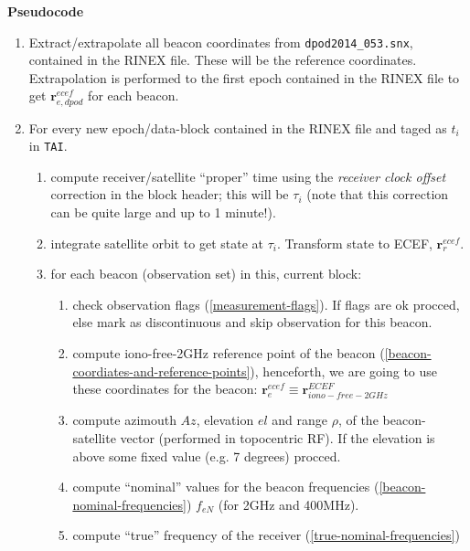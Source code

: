 \textbf{Pseudocode}
\begin{enumerate}
  
  \item Extract/extrapolate all beacon coordinates from \texttt{dpod2014\_053.snx}, 
    contained in the RINEX file. These will be the reference coordinates. 
    Extrapolation is performed to the first epoch contained in the RINEX file to 
    get $\bm{r}_{e,dpod}^{ecef}$ for each beacon.

  \item For every new epoch/data-block contained in the RINEX file and taged as $t_i$ in \texttt{TAI}.
  \begin{enumerate}
    \item compute receiver/satellite ``proper'' time using the 
    \emph{receiver clock offset} correction in the block header; this will 
     be $\tau_{i}$ (note that this correction can be quite large and up to 
     1 minute!).

    \item integrate satellite orbit to get state at {\color{red} $\tau_{i}$}. 
    Transform state to ECEF, $\bm{r}_{r}^{ecef}$.

    \item for each beacon (observation set) in this, current block:
    \begin{enumerate}
      \item check observation flags (\ref{measurement-flags}). If flags are ok 
      procced, else mark as discontinuous and skip observation for this beacon.

      \item compute iono-free-2GHz reference point of the beacon 
      (\ref{beacon-coordiates-and-reference-points}), henceforth, we are going 
      to use these coordinates for the beacon: 
      $\bm{r}_{e}^{ecef} \equiv \bm{r}_{iono-free-2GHz}^{ECEF}$

      \item compute azimouth $Az$, elevation $el$ and range $\rho$, of the 
      beacon-satellite vector (performed in topocentric RF). If the elevation 
      is above some fixed value (e.g. 7 degrees) procced.

      \item compute ``nominal'' values for the beacon frequencies 
      (\ref{beacon-nominal-frequencies}) $f_{eN}$ (for 2GHz and 400MHz).

      \item compute ``true'' frequency of the receiver (\ref{true-nominal-frequencies})


\end{enumerate}
\end{enumerate}
\end{enumerate}
